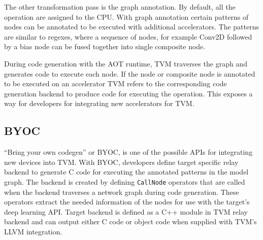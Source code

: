 \documentclass[12pt,a4paper,english
]{tunithesis}
\begin{document}
The other transformation pass is the graph annotation. By default, all the operation are assigned to the CPU. With graph annotation certain patterns of nodes can be annotated to be executed with additional accelerators. The patterns are similar to regexes, where a sequence of nodes, for example Conv2D followed by a bias node can be fused together into single composite node.

During code generation with the AOT runtime, TVM traverses the graph and generates code to execute each node. If the node or composite node is annotated to be executed on an accelerator TVM refers to the corresponding code generation backend to produce code for executing the operation. This exposes a way for developers for integrating new accelerators for TVM.

\subsection{BYOC}
``Bring your own codegen'' or BYOC, is one of the possible APIs for integrating new devices into TVM.
With BYOC, developers define target specific relay backend to generate C code for executing the annotated patterns in the model graph.
The backend is created by defining \texttt{CallNode} operators that are called when the backend traverses a network graph during code generation.
These operators extract the needed information of the nodes for use with the target's deep learning API.
Target backend is defined as a C++ module in TVM relay backend and can output either C code or object code when supplied with TVM's LLVM integration.
\end{document}
